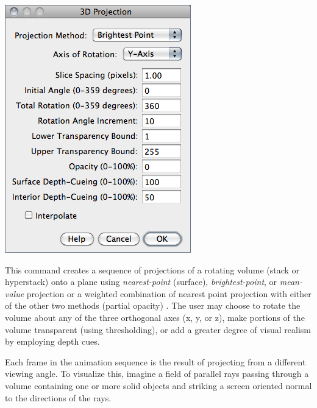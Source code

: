 \begin{minipage}[c][1\totalheight][t]{0.43\columnwidth}%
\includegraphics[scale=0.55]{images/3D-Project}%
\end{minipage}%
\begin{minipage}[c][1\totalheight][t]{0.57\columnwidth}%
This command creates a sequence of projections of a rotating volume
(stack
or hyperstack) onto a plane using \emph{nearest-point} (surface),
\emph{brightest-point}, or \emph{mean-value} projection or a weighted
combination of nearest point projection with either of the other two
methods (partial opacity) \cite{C-3Dproject}. The user may choose
to rotate the volume about any of the three orthogonal axes (x, y,
or z), make portions of the volume transparent (using thresholding),
or add a greater degree of visual realism by employing depth cues.\medskip{}


Each frame in the animation sequence is the result of projecting from
a different viewing angle. To visualize this, imagine a field of parallel
rays passing through a volume containing one or more solid objects
and striking a screen oriented normal to the directions of the rays.%
\end{minipage}

